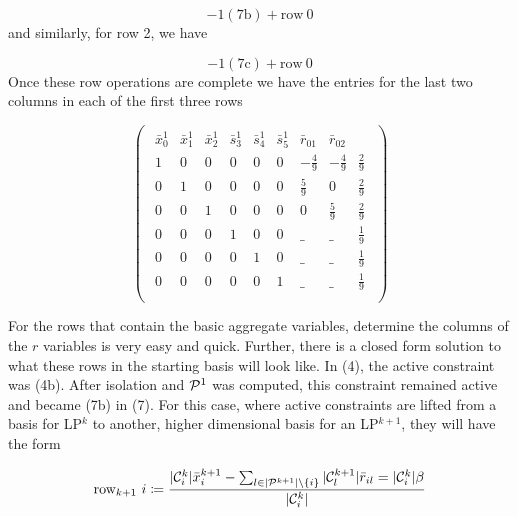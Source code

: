 \documentclass[11pt]{article} %
\newcommand{\cP}{{\cal P}}
\newcommand{\cC}{{\cal C}}
\begin{document}
	\begin{equation}
	-1(7\text{b}) + \text{row} \ 0
	\end{equation}
	and similarly, for row 2, we have
	
	\begin{equation}
	-1(7\text{c}) + \text{row} \ 0
	\end{equation}
	Once these row operations are complete we have the entries for the last two columns in each of the first three rows 
	
	\begin{equation}
	\begin{pmatrix}
	\begin{array}{cccccc|cc|c}
		\bar{x}^1_0 & \bar{x}^1_1 & \bar{x}^1_2 & \bar{s}^1_3 & \bar{s}^1_4 & \bar{s}^1_5 & \bar{r}_{01} & \bar{r}_{02} \\
	\hline
	1 & 0 & 0 & 0 & 0 & 0 & -\frac{4}{9} & -\frac{4}{9} & \frac{2}{9} \\ 
	0 & 1 & 0 & 0 & 0 & 0 &  \frac{5}{9} & 0 & \frac{2}{9} \\ 
	0 & 0 & 1 & 0 & 0 & 0 & 0 & \frac{5}{9} & \frac{2}{9} \\ 
	0 & 0 & 0 & 1 & 0 & 0 & \_ & \_ & \frac{1}{9} \\ 
	0 & 0 & 0 & 0 & 1 & 0 & \_ & \_ & \frac{1}{9} \\
	0 & 0 & 0 & 0 & 0 & 1 & \_ & \_ & \frac{1}{9} \\
	\end{array}
	\end{pmatrix}
	\end{equation}
	
	For the rows that contain the basic aggregate variables, determine the columns of the $r$ variables is very easy and quick.  Further, there is a closed form solution to what these rows in the starting basis will look like.  In (4), the active constraint was (4b).  After isolation and $\cP^1$ was computed, this constraint remained active and became (7b) in (7).  For this case, where active constraints are lifted from a basis for LP$^k$ to another, higher dimensional basis for an LP$^{k + 1}$, they will have the form 
	
	\begin{equation}
	\text{row}_{k + 1} \ i \coloneqq \frac{|\cC_i^{k}|\bar{x}_i^{k + 1} - \sum_{l \in |\cP^{k + 1}| \backslash \{i\}}|\cC^{k + 1}_l|\bar{r}_{il} = |\cC^{k}_i|\beta}{|\cC_i^{k}|}
	\end{equation}
	
\end{document}
